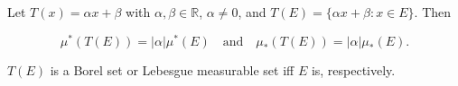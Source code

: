 Let $T(x) = \alpha x + \beta$ with $\alpha,\beta \in \mathbb{R}$, $\alpha \neq 0$, and $T(E) = \{ \alpha x + \beta : x \in E \}$. Then

$$\mu^*(T(E)) = |\alpha| \mu^*(E) \quad \text{and} \quad \mu_*(T(E)) = |\alpha| \mu_*(E).$$

$T(E)$ is a Borel set or Lebesgue measurable set iff $E$ is, respectively.
